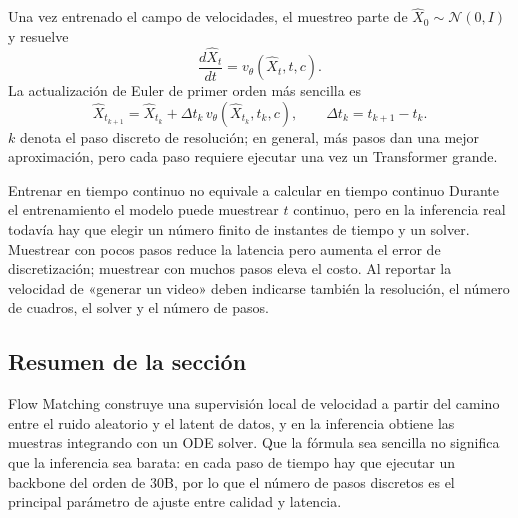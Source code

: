 Una vez entrenado el campo de velocidades, el muestreo parte de $\hat X_0\sim\mathcal N(0,I)$ y resuelve
\[
\frac{d\hat X_t}{dt}=v_\theta(\hat X_t,t,c).
\]
La actualización de Euler de primer orden más sencilla es
\[
\hat X_{t_{k+1}}
=\hat X_{t_k}+\Delta t_k\,v_\theta(\hat X_{t_k},t_k,c),
\qquad \Delta t_k=t_{k+1}-t_k.
\]
$k$ denota el paso discreto de resolución; en general, más pasos dan una mejor aproximación, pero cada paso requiere ejecutar una vez un Transformer grande.


\begin{warningbox}{Entrenar en tiempo continuo no equivale a calcular en tiempo continuo}
Durante el entrenamiento el modelo puede muestrear $t$ continuo, pero en la inferencia real todavía hay que elegir un número finito de instantes de tiempo y un solver. Muestrear con pocos pasos reduce la latencia pero aumenta el error de discretización; muestrear con muchos pasos eleva el costo. Al reportar la velocidad de «generar un video» deben indicarse también la resolución, el número de cuadros, el solver y el número de pasos.
\end{warningbox}


\subsection{Resumen de la sección}

Flow Matching construye una supervisión local de velocidad a partir del camino entre el ruido aleatorio y el latent de datos, y en la inferencia obtiene las muestras integrando con un ODE solver. Que la fórmula sea sencilla no significa que la inferencia sea barata: en cada paso de tiempo hay que ejecutar un backbone del orden de 30B, por lo que el número de pasos discretos es el principal parámetro de ajuste entre calidad y latencia.
